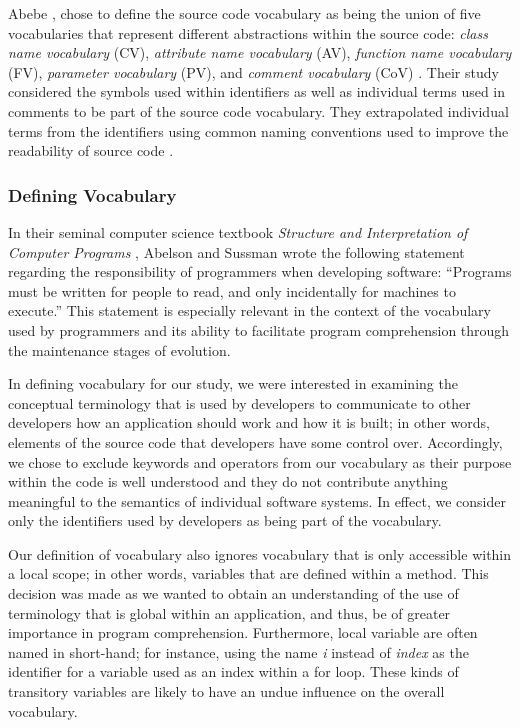 Abebe \etal, chose to define the source code vocabulary as being the union of five vocabularies that represent different abstractions within the source code: \emph{class name vocabulary} (CV), \emph{attribute name vocabulary} (AV), \emph{function name vocabulary} (FV), \emph{parameter vocabulary} (PV), and \emph{comment vocabulary} (CoV) \cite{Abebe09a}. Their study considered the symbols used within identifiers as well as individual terms used in comments to be part of the source code vocabulary. They extrapolated individual terms from the identifiers using common naming conventions used to improve the readability of source code \cite{Reddy00a}.


\subsubsection{Defining Vocabulary} %
\label{ssub:defining_vocabulary}

In their seminal computer science textbook \emph{Structure and Interpretation of Computer Programs} \cite{Abelson96a}, Abelson and Sussman wrote the following statement regarding the responsibility of programmers when developing software: ``Programs must be written for people to read, and only incidentally for machines to execute.'' This statement is especially relevant in the context of the vocabulary used by programmers and its ability to facilitate program comprehension through the maintenance stages of evolution.

In defining vocabulary for our study, we were interested in examining the conceptual terminology that is used by developers to communicate to other developers how an application should work and how it is built; in other words, elements of the source code that developers have some control over. Accordingly, we chose to exclude keywords and operators from our vocabulary as their purpose within the code is well understood and they do not contribute anything meaningful to the semantics of individual software systems. In effect, we consider only the identifiers used by developers as being part of the vocabulary.

Our definition of vocabulary also ignores vocabulary that is only accessible within a local scope; in other words, variables that are defined within a method. This decision was made as we wanted to obtain an understanding of the use of terminology that is global within an application, and thus, be of greater importance in program comprehension. Furthermore, local variable are often named in short-hand; for instance, using the name \emph{i} instead of \emph{index} as the identifier for a variable used as an index within a for loop. These kinds of transitory variables are likely to have an undue influence on the overall vocabulary.

